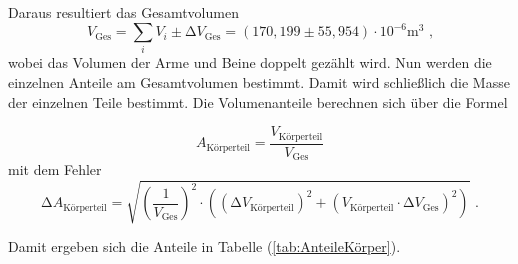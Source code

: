 Daraus resultiert das Gesamtvolumen
\begin{equation*}
  V_{\text{Ges}} = \sum_i V_{i} \pm  \increment V_{\text{Ges}}= (170,199 \pm 55,954) \cdot 10^{-6} \unit{\cubic\meter} \text{ ,}
\end{equation*}
wobei das Volumen der Arme und Beine doppelt gezählt wird.
Nun werden die einzelnen Anteile am Gesamtvolumen bestimmt.
Damit wird schließlich die Masse der einzelnen Teile bestimmt.
Die Volumenanteile berechnen sich über die Formel


\begin{equation*}
  A_{\text{Körperteil}} = \frac {V_{\text{Körperteil}}} {V_{\text{Ges}}}
\end{equation*}
mit dem Fehler
\begin{equation*}
  \increment A_{\text{Körperteil}} = \sqrt{\left(\frac{1}{V_{\text{Ges}}}\right)^2 
  \cdot \left(\left( \increment V_{\text{Körperteil}} \right)^2 + \left( V_{\text{Körperteil}} 
  \cdot \increment V_{\text{Ges}} \right)^2\right)} \text{ .}
\end{equation*}

Damit ergeben sich die Anteile in Tabelle (\ref{tab:AnteileKörper}).


